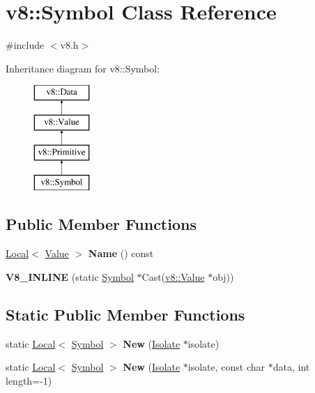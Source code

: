 \hypertarget{classv8_1_1_symbol}{}\section{v8\+:\+:Symbol Class Reference}
\label{classv8_1_1_symbol}


{\ttfamily \#include $<$v8.\+h$>$}

Inheritance diagram for v8\+:\+:Symbol\+:\begin{figure}[H]
\begin{center}
\leavevmode
\includegraphics[height=4.000000cm]{classv8_1_1_symbol}
\end{center}
\end{figure}
\subsection*{Public Member Functions}
\begin{DoxyCompactItemize}
\item 
\hypertarget{classv8_1_1_symbol_af1c1ccf079ac99e0db858c30e6458587}{}\hyperlink{classv8_1_1_local}{Local}$<$ \hyperlink{classv8_1_1_value}{Value} $>$ {\bfseries Name} () const \label{classv8_1_1_symbol_af1c1ccf079ac99e0db858c30e6458587}

\item 
\hypertarget{classv8_1_1_symbol_ada48cd2d5549a705460c91ebb4b2f0cc}{}{\bfseries V8\+\_\+\+I\+N\+L\+I\+N\+E} (static \hyperlink{classv8_1_1_symbol}{Symbol} $\ast$Cast(\hyperlink{classv8_1_1_value}{v8\+::\+Value} $\ast$obj))\label{classv8_1_1_symbol_ada48cd2d5549a705460c91ebb4b2f0cc}

\end{DoxyCompactItemize}
\subsection*{Static Public Member Functions}
\begin{DoxyCompactItemize}
\item 
\hypertarget{classv8_1_1_symbol_a546e3cf37fddc735503a5f07b95295c9}{}static \hyperlink{classv8_1_1_local}{Local}$<$ \hyperlink{classv8_1_1_symbol}{Symbol} $>$ {\bfseries New} (\hyperlink{classv8_1_1_isolate}{Isolate} $\ast$isolate)\label{classv8_1_1_symbol_a546e3cf37fddc735503a5f07b95295c9}

\item 
\hypertarget{classv8_1_1_symbol_a713b8ddd0d38bf9281f4a3d6f1e22125}{}static \hyperlink{classv8_1_1_local}{Local}$<$ \hyperlink{classv8_1_1_symbol}{Symbol} $>$ {\bfseries New} (\hyperlink{classv8_1_1_isolate}{Isolate} $\ast$isolate, const char $\ast$data, int length=-\/1)\label{classv8_1_1_symbol_a713b8ddd0d38bf9281f4a3d6f1e22125}

\end{DoxyCompactItemize}


